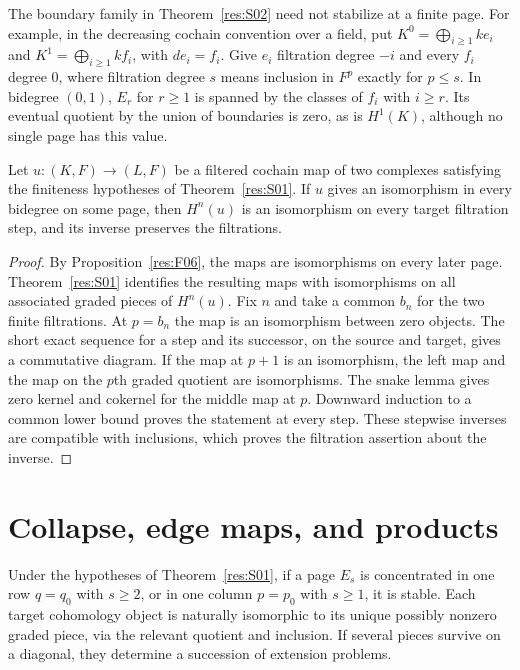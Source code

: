 The boundary family in Theorem~\ref{res:S02} need not stabilize
at a finite page. For example, in the decreasing cochain
convention over a field, put $K^0=\bigoplus_{i\geq1}k e_i$ and
$K^1=\bigoplus_{i\geq1}k f_i$, with $d e_i=f_i$. Give $e_i$
filtration degree $-i$ and every $f_i$ degree $0$, where
filtration degree $s$ means inclusion in $F^p$ exactly for
$p\leq s$. In bidegree $(0,1)$, $E_r$ for $r\geq1$ is
spanned by the classes of $f_i$ with $i\geq r$.
Its eventual quotient by the union of boundaries is zero,
as is $H^1(K)$, although no single page has this value.

\begin{corollary}
\label{res:S03}
Let $u\colon(K,F)\to(L,F)$ be a filtered cochain map of two
complexes satisfying the finiteness hypotheses of
Theorem~\ref{res:S01}. If $u$ gives an isomorphism in every
bidegree on some page, then $H^n(u)$ is an isomorphism on every
target filtration step, and its inverse preserves the filtrations.
\end{corollary}

\begin{proof}
By Proposition~\ref{res:F06}, the maps are isomorphisms on every
later page. Theorem~\ref{res:S01} identifies the resulting maps
with isomorphisms on all associated graded pieces of $H^n(u)$.
Fix $n$ and take a common $b_n$ for the two finite filtrations.
At $p=b_n$ the map is an isomorphism between zero objects.
The short exact sequence for a step and its successor, on the
source and target, gives a commutative diagram. If the map at
$p+1$ is an isomorphism, the left map and the map on the
$p$th graded quotient are isomorphisms. The snake lemma gives
zero kernel and cokernel for the middle map at $p$. Downward
induction to a common lower bound proves the statement at every
step. These stepwise inverses are compatible with inclusions,
which proves the filtration assertion about the inverse.
\end{proof}

\section{Collapse, edge maps, and products}

\begin{proposition}
\label{res:S04}
Under the hypotheses of Theorem~\ref{res:S01}, if a page $E_s$ is
concentrated in one row $q=q_0$ with $s\geq2$, or in one column
$p=p_0$ with $s\geq1$, it is stable. Each target cohomology object
is naturally isomorphic to its unique possibly nonzero graded
piece, via the relevant quotient and inclusion. If several pieces
survive on a diagonal, they determine a succession of extension
problems.
\end{proposition}

